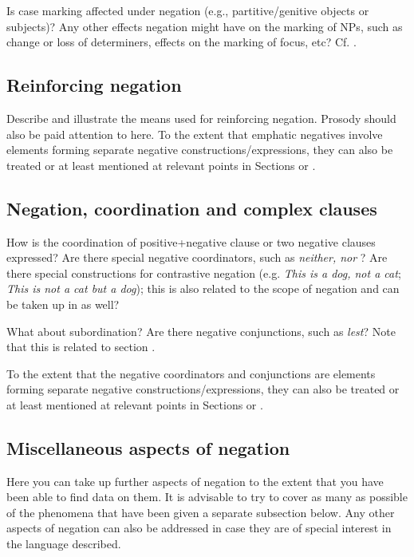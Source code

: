 \documentclass[output=paper,colorlinks,citecolor=brown]{langscibook}
\begin{document}
Is case marking affected under negation (e.g., partitive/genitive objects or subjects)? Any other effects negation might have on the marking of NPs, such as change or loss of determiners, effects on the marking of focus, etc? Cf. \citet{Miestamo2014}.

\subsection{Reinforcing negation}\label{sec:quest:4.4}

Describe and illustrate the means used for reinforcing negation. Prosody should also be paid attention to here. To the extent that emphatic negatives involve elements forming separate negative constructions/expressions, they can also be treated or at least mentioned at relevant points in Sections  or .

\subsection{Negation, coordination and complex clauses}\label{sec:quest:4.5}

How is the coordination of positive+negative clause or two negative clauses expressed? Are there special negative coordinators, such as \textit{neither, nor} ? Are there special constructions for contrastive negation (e.g. \textit{This is a dog, not a cat}; \textit{This is not a cat but a dog}); this is also related to the scope of negation and can be taken up in  as well?

What about subordination? Are there negative conjunctions, such as \textit{lest}? Note that this is related to section .

To the extent that the negative coordinators and conjunctions are elements forming separate negative constructions/expressions, they can also be treated or at least mentioned at relevant points in Sections  or .

\subsection{Miscellaneous aspects of negation}\label{sec:quest:4.6}

Here you can take up further aspects of negation to the extent that you have been able to find data on them. It is advisable to try to cover as many as possible of the phenomena that have been given a separate subsection below. Any other aspects of negation can also be addressed in case they are of special interest in the language described. 
\end{document}
